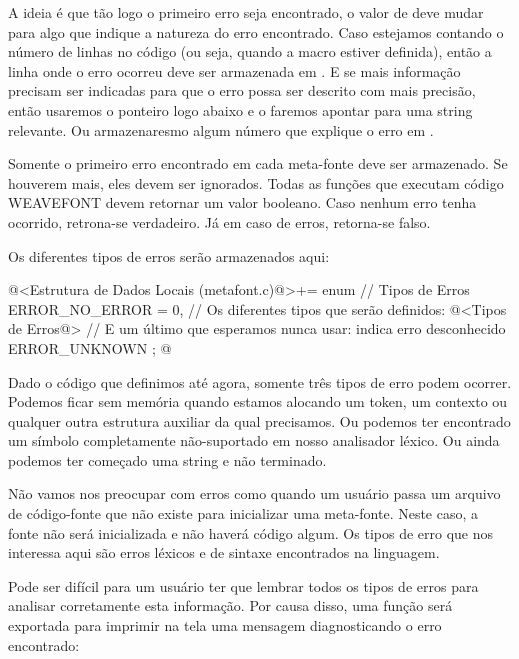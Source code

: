 A ideia é que tão logo o primeiro erro seja encontrado, o valor
de  deve mudar para algo que indique a natureza do
erro encontrado. Caso estejamos contando o número de linhas no código
(ou seja, quando a macro  estiver
definida), então a linha onde o erro ocorreu deve ser armazenada
em . E se mais informação precisam ser
indicadas para que o erro possa ser descrito com mais precisão, então
usaremos o ponteiro logo abaixo e o faremos apontar para uma string
relevante. Ou armazenaresmo algum número que explique o erro
em .

Somente o primeiro erro encontrado em cada meta-fonte deve ser
armazenado. Se houverem mais, eles devem ser ignorados. Todas as
funções que executam código WEAVEFONT devem retornar um valor
booleano. Caso nenhum erro tenha ocorrido, retrona-se verdadeiro. Já
em caso de erros, retorna-se falso.

Os diferentes tipos de erros serão armazenados aqui:

\iniciocodigo
@<Estrutura de Dados Locais (metafont.c)@>+=
enum { // Tipos de Erros
  ERROR_NO_ERROR = 0,
  // Os diferentes tipos que serão definidos:
  @<Tipos de Erros@>
  // E um último que esperamos nunca usar: indica erro desconhecido
  ERROR_UNKNOWN
};
@
\fimcodigo

Dado o código que definimos até agora, somente três tipos de erro
podem ocorrer. Podemos ficar sem memória quando estamos alocando um
token, um contexto ou qualquer outra estrutura auxiliar da qual
precisamos. Ou podemos ter encontrado um símbolo completamente
não-suportado em nosso analisador léxico. Ou ainda podemos ter
começado uma string e não terminado.

Não vamos nos preocupar com erros como quando um usuário passa um
arquivo de código-fonte que não existe para inicializar uma
meta-fonte. Neste caso, a fonte não será inicializada e não haverá
código algum. Os tipos de erro que nos interessa aqui são erros
léxicos e de sintaxe encontrados na linguagem.

Pode ser difícil para um usuário ter que lembrar todos os tipos de
erros para analisar corretamente esta informação. Por causa disso, uma
função será exportada para imprimir na tela uma mensagem
diagnosticando o erro encontrado:

